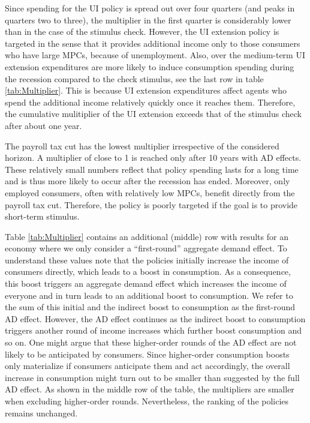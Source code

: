 \documentclass[../HAFiscal]{subfiles}
\begin{document}
Since spending for the UI policy is spread out over four quarters (and peaks in quarters two to three), the multiplier in the first quarter is considerably lower than in the case of the stimulus check.
However, the UI extension policy is targeted in the sense that it provides additional income only to those consumers who have large MPCs, because of unemployment.
Also, over the medium-term UI extension expenditures   are more likely to induce consumption spending during the recession compared to the check stimulus, see the last row in table \ref{tab:Multiplier}.
This is because UI extension expenditures affect agents who spend the additional income relatively quickly once it reaches them.
Therefore, the cumulative mulitiplier of the UI extension exceeds that of the stimulus check after about one year.



The payroll tax cut has the lowest multiplier irrespective of the considered horizon.
A multiplier of close to 1 is reached only after 10 years with AD effects.
These relatively small numbers reflect that policy spending lasts for a long time and is thus more likely to occur after the recession has ended.
Moreover, only employed consumers, often with relatively low MPCs, benefit directly from the payroll tax cut.
Therefore, the policy is poorly targeted if the goal is to provide short-term stimulus.

Table \ref{tab:Multiplier} contains an additional (middle) row with results for an economy where we only consider a ``first-round'' aggregate demand effect.
To understand these values note that the policies initially increase the income of consumers directly, which leads to a boost in consumption.
As a consequence, this boost triggers an aggregate demand effect which increases the income of everyone and in turn leads to an additional boost to consumption.
We refer to the sum of this initial and the indirect boost to consumption as the first-round AD effect.
However, the AD effect continues as the indirect boost to consumption triggers another round of income increases which further boost consumption and so on.
One might argue that these higher-order rounds of the AD effect are not likely to be anticipated by consumers.
Since higher-order consumption boosts only materialize if consumers anticipate them and act accordingly, the overall increase in consumption might turn out to be smaller than suggested by the full AD effect.
As shown in the middle row of the table, the multipliers are smaller when excluding higher-order rounds.
Nevertheless, the ranking of the policies remains unchanged.
\end{document}
